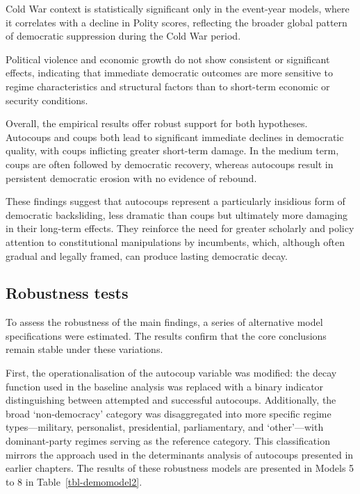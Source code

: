 \documentclass[
  12pt,
]{report}
\begin{document}
Cold War context is statistically significant only in the event-year
models, where it correlates with a decline in Polity scores, reflecting
the broader global pattern of democratic suppression during the Cold War
period.

Political violence and economic growth do not show consistent or
significant effects, indicating that immediate democratic outcomes are
more sensitive to regime characteristics and structural factors than to
short-term economic or security conditions.

Overall, the empirical results offer robust support for both hypotheses.
Autocoups and coups both lead to significant immediate declines in
democratic quality, with coups inflicting greater short-term damage. In
the medium term, coups are often followed by democratic recovery,
whereas autocoups result in persistent democratic erosion with no
evidence of rebound.

These findings suggest that autocoups represent a particularly insidious
form of democratic backsliding, less dramatic than coups but ultimately
more damaging in their long-term effects. They reinforce the need for
greater scholarly and policy attention to constitutional manipulations
by incumbents, which, although often gradual and legally framed, can
produce lasting democratic decay.

\subsection*{Robustness tests}\label{robustness-tests}

To assess the robustness of the main findings, a series of alternative
model specifications were estimated. The results confirm that the core
conclusions remain stable under these variations.

First, the operationalisation of the autocoup variable was modified: the
decay function used in the baseline analysis was replaced with a binary
indicator distinguishing between attempted and successful autocoups.
Additionally, the broad `non-democracy' category was disaggregated into
more specific regime types---military, personalist, presidential,
parliamentary, and `other'---with dominant-party regimes serving as the
reference category. This classification mirrors the approach used in the
determinants analysis of autocoups presented in earlier chapters. The
results of these robustness models are presented in Models 5 to 8 in
Table~\ref{tbl-demomodel2}.
\end{document}
